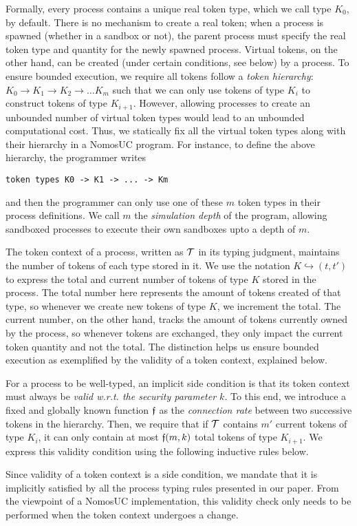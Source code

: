 Formally, every process contains a unique real token type, which we call type $K_0$, by default.
There is no mechanism to create a real token; when a process is spawned (whether in a sandbox or not),
the parent process must specify the real token type and quantity for the newly spawned process.
Virtual tokens, on the other hand, can be created (under certain conditions, see below) by a process.
To ensure bounded execution, we require all tokens follow a \emph{token hierarchy}: $K_0 \to K_1 \to K_2 \to \ldots K_m$
such that we can only use tokens of type $K_i$ to construct tokens of type $K_{i+1}$.
However, allowing processes to create an unbounded number of virtual token types would lead to
an unbounded computational cost.
Thus, we statically fix all the virtual token types along with their hierarchy in a NomosUC program.
For instance, to define the above hierarchy, the programmer writes
\begin{lstlisting}[basicstyle=\footnotesize\BeraMonottFamily]
  token types K0 -> K1 -> ... -> Km
\end{lstlisting}
and then the programmer can only use one of these $m$ token types in their process definitions.
We call $m$ the \emph{simulation depth} of the program, allowing sandboxed processes to execute their
own sandboxes upto a depth of $m$.

The token context of a process, written as $\mathcal{T}$ in its typing judgment, maintains the number
of tokens of each type stored in it.
We use the notation $K \hookrightarrow (t, t')$ to express the total and current number of tokens
of type $K$ stored in the process.
The total number here represents the amount of tokens created of that type, so whenever we create
new tokens of type $K$, we increment the total.
The current number, on the other hand, tracks the amount of tokens currently owned by the process,
so whenever tokens are exchanged, they only impact the current token quantity and not the total.
The distinction helps us ensure bounded execution as exemplified by the validity of a token context, explained below.

For a process to be well-typed, an implicit side condition is
that its token context must always be \emph{valid w.r.t. the security parameter $k$}.
To this end, we introduce a fixed and globally known function $\mathfrak{f}$ as the \emph{connection rate}
between two successive tokens in the hierarchy.
Then, we require that if $\mathcal{T}$ contains $m'$ current tokens of type
$K_i$, it can only contain at most $\mathfrak{f}(m,k)$ total tokens of type
$K_{i+1}$. We express this validity condition using the following inductive rules below.
Since validity of a token context is a side condition, we mandate
that it is implicitly satisfied by all the process typing rules
presented in our paper.
From the viewpoint of a NomosUC implementation, this validity check only
needs to be performed when the token context undergoes a change.

